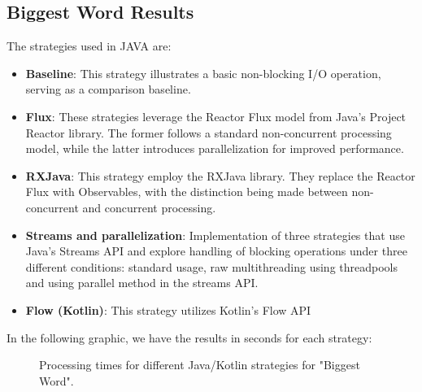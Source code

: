 \subsection{Biggest Word Results}
\label{subsubsec:biggest_word_results}

The strategies used in JAVA are:
\begin{itemize}
    \item \textbf{Baseline}: This strategy illustrates a basic non-blocking I/O operation, serving as a comparison baseline.
    \item \textbf{Flux}: These strategies leverage the Reactor Flux model from Java's Project Reactor library. The former follows a standard non-concurrent processing model, while the latter introduces parallelization for improved performance.
    \item \textbf{RXJava}: This strategy employ the RXJava library. They replace the Reactor Flux with Observables, with the distinction being made between non-concurrent and concurrent processing.
    \item \textbf{Streams and parallelization}: Implementation of three strategies that use Java's Streams API and explore handling of blocking operations under three different conditions: standard usage, raw multithreading using threadpools and using parallel method in the streams API.
    \item \textbf{Flow (Kotlin)}: This strategy utilizes Kotlin's Flow API
\end{itemize}

In the following graphic, we have the results in seconds for each strategy:
\begin{figure}[H]
    \centering
    \caption{Processing times for different Java/Kotlin strategies for "Biggest Word".}
    \label{fig:biggest_word_processing_times_java}
\end{figure}
    
